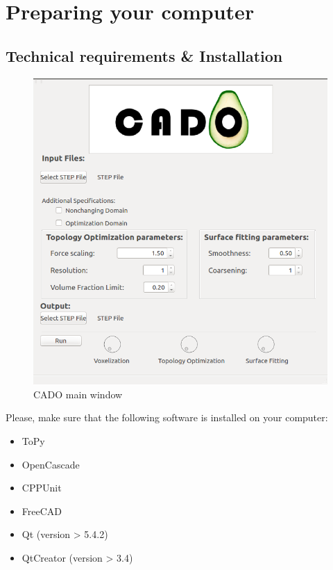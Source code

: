 \documentclass[
12pt, %
a4paper, %
oneside, %
headinclude,footinclude, %
BCOR5mm, %
]{scrartcl}
\begin{document}

\newpage %


\section{Preparing your computer}
\label{sec:prep}
\subsection{Technical requirements \& Installation}
\begin{figure}
\centering
\includegraphics[scale=0.4]{Pictures/CADO_mainWindow.png}
\caption{CADO main window}
\label{fig:mainWindow}
\end{figure}
Please, make sure that the following software is installed on your computer:
\begin{itemize}
\item ToPy
\item OpenCascade
\item CPPUnit
\item FreeCAD
\item Qt (version > 5.4.2)
\item QtCreator (version > 3.4) 
\end{itemize}
\end{document}
